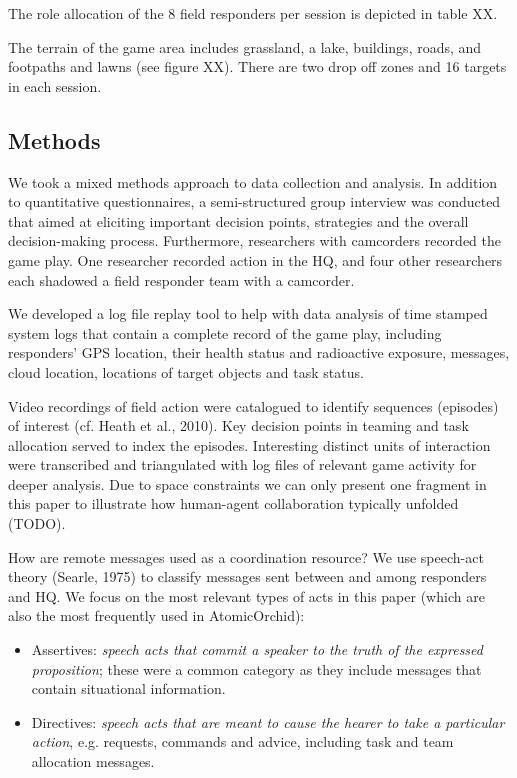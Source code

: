 The role allocation of the 8 field responders per session is depicted in table XX. 

The terrain of the game area includes grassland, a lake, buildings, roads, and footpaths and lawns (see figure XX). There are two drop off zones and 16 targets in each session.

\subsection{Methods}
We took a mixed methods approach to data collection and analysis. In addition to quantitative questionnaires, a semi-structured group interview was conducted that aimed at eliciting important decision points, strategies and the overall decision-making process. Furthermore, researchers with camcorders recorded the game play. One researcher recorded action in the HQ, and four other researchers each shadowed a field responder team with a camcorder.

We developed a log file replay tool to help with data analysis of time stamped system logs that contain a complete record of the game play, including responders' GPS location, their health status and radioactive exposure, messages, cloud location, locations of target objects and task status.

Video recordings of field action were catalogued to identify sequences (episodes) of interest (cf. Heath et al., 2010). Key decision points in teaming and task allocation served to index the episodes. Interesting distinct units of interaction were transcribed and triangulated with log files of relevant game activity for deeper analysis. Due to space constraints we can only  present one fragment in this paper to illustrate how human-agent collaboration typically unfolded (TODO).

How are remote messages used as a coordination resource? We use speech-act theory (Searle, 1975) to classify messages sent between and among responders and HQ. We focus on the most relevant types of acts in this paper (which are also the most frequently used in AtomicOrchid):

\begin{itemize}
\item Assertives: \textit{speech acts that commit a speaker to the truth of the expressed proposition}; these were a common category as they include messages that contain situational information.
\item Directives: \textit{speech acts that are meant to cause the hearer to take a particular action}, e.g. requests, commands and advice, including task and team allocation messages. 
\end{itemize}

